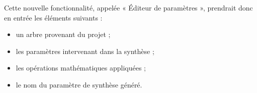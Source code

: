 \documentclass[a4paper]{article}
\begin{document}
Cette nouvelle fonctionnalité, appelée « Éditeur de paramètres », prendrait donc en entrée les éléments suivants :
\begin{itemize}[label=,font=\color{magenta},parsep=0cm,itemsep=0cm]
\item un arbre provenant du projet ;
\item les paramètres intervenant dans la synthèse ;
\item les opérations mathématiques appliquées ;
\item le nom du paramètre de synthèse généré.
\end{itemize}
\end{document}
